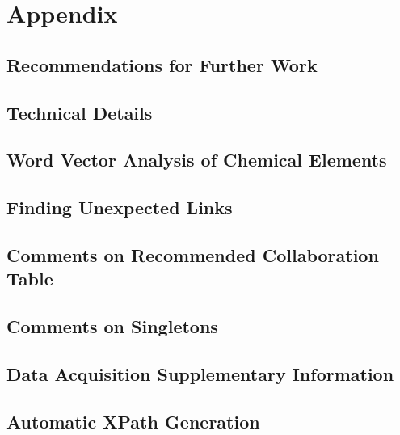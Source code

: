 \chapter{Appendix}
\section{Recommendations for Further Work}

\newpage
\section{Technical Details}

\newpage
\section{Word Vector Analysis of Chemical Elements}

\newpage
\section{Finding Unexpected Links}

\newpage
\section{Comments on Recommended Collaboration Table}

\newpage
\section{Comments on Singletons}

\newpage
\section{Data Acquisition Supplementary Information}

\newpage
\section{Automatic XPath Generation}
